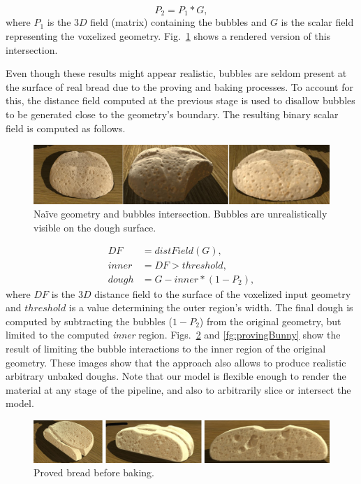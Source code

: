 \documentclass[spanish,a4paper,11pt,oneside,links]{report}
\begin{document}
\begin{equation*}
P_{2} = P_{1} * G,
\end{equation*}
%
where $P_{1}$ is the $3D$ field (matrix) containing the bubbles and $G$ is the scalar field representing the voxelized geometry. 
Fig.~\ref{fg:intersectProblem} shows a rendered version of this intersection.

Even though these results might appear realistic, bubbles are seldom present at the surface of real bread due to the proving and baking processes. 
To account for this, the distance field computed at the previous stage is used to disallow bubbles to be generated close to the geometry's boundary. 
The resulting binary scalar field is computed as follows.

\begin{figure}
\includegraphics[width=19cm]{figures/intersectProblem}
\caption{Na\"ive geometry and bubbles intersection. Bubbles are unrealistically visible on the dough surface.}
\label{fg:intersectProblem}
\end{figure}

\begin{align*}
DF    &= distField(G),\\
inner &= DF > threshold,\\
dough &= G - inner*(1-P_{2}),
\end{align*}
%
where $DF$ is the $3D$ distance field to the surface of the voxelized input geometry and $threshold$ is a value determining the outer region's width.
The final dough is computed by subtracting the bubbles ($1-P_{2}$) from the original geometry, but limited to the computed {\em inner} region. Figs.~\ref{fg:proving} and \ref{fg:provingBunny} show the result of limiting the bubble interactions to the inner region of the original geometry.
These images show that the approach also allows to produce realistic arbitrary unbaked doughs.
Note that our model is flexible enough to render the material at any stage of the pipeline, and also to arbitrarily slice or intersect the model.

\begin{figure}
\includegraphics[width=19cm]{figures/prebakebread}
\caption{Proved bread before baking.}
\label{fg:proving}
\end{figure}
\end{document}
